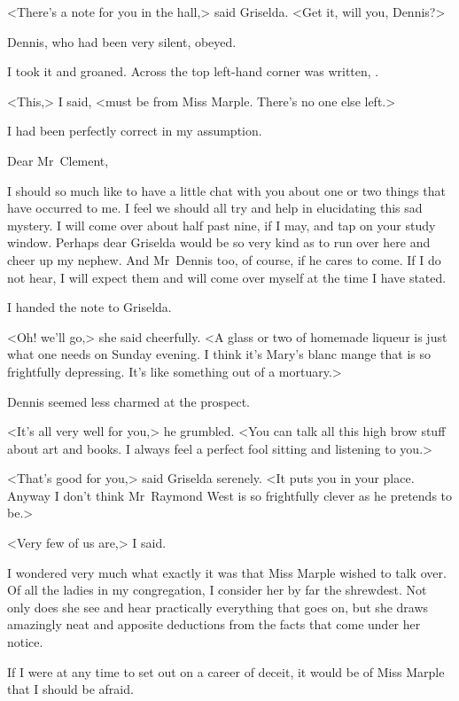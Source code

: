 <There's a note for you in the hall,> said Griselda. <Get it, will you, Dennis?>

Dennis, who had been very silent, obeyed.

I took it and groaned. Across the top left-hand corner was written, .

<This,> I said, <must be from Miss Marple. There's no one else left.>

I had been perfectly correct in my assumption.

\begin{mail}{}{Dear Mr~Clement,}


I should so much like to have a little chat with you about one or two things that have occurred to me. I feel we should all try and help in elucidating this sad mystery. I will come over about half past nine, if I may, and tap on your study window. Perhaps dear Griselda would be so very kind as to run over here and cheer up my nephew. And Mr~Dennis too, of course, if he cares to come. If I do not hear, I will expect them and will come over myself at the time I have stated.

\end{mail}

I handed the note to Griselda.

<Oh! we'll go,> she said cheerfully. <A glass or two of homemade liqueur is just what one needs on Sunday evening. I think it's Mary's blanc mange that is so frightfully depressing. It's like something out of a mortuary.>

Dennis seemed less charmed at the prospect.

<It's all very well for you,> he grumbled. <You can talk all this high brow stuff about art and books. I always feel a perfect fool sitting and listening to you.>

<That's good for you,> said Griselda serenely. <It puts you in your place. Anyway I don't think Mr~Raymond West is so frightfully clever as he pretends to be.>

<Very few of us are,> I said.

I wondered very much what exactly it was that Miss Marple wished to talk over. Of all the ladies in my congregation, I consider her by far the shrewdest. Not only does she see and hear practically everything that goes on, but she draws amazingly neat and apposite deductions from the facts that come under her notice.

If I were at any time to set out on a career of deceit, it would be of Miss Marple that I should be afraid.

